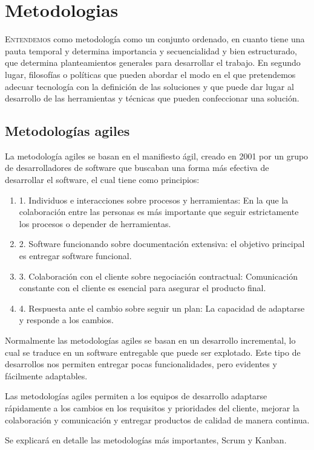 \chapter{Metodologias}
\label{chap:metodologias}


\lettrine{E}{ntendemos} como metodología como un conjunto ordenado, en cuanto tiene una pauta temporal y determina importancia y secuencialidad y bien estructurado, que determina planteamientos generales para desarrollar el trabajo. En segundo lugar, filosofías o políticas que pueden abordar el modo en el que pretendemos adecuar tecnología con la definición de las soluciones y que puede dar lugar al desarrollo de las herramientas y técnicas que pueden confeccionar una solución. 

\section{Metodologías agiles}

La metodología agiles se basan en el manifiesto ágil, creado en 2001 por un grupo de desarrolladores de software que buscaban una forma más efectiva de desarrollar el software, el cual tiene como principios:

\begin{enumerate}
    \item 1.	Individuos e interacciones sobre procesos y herramientas: En la que la colaboración entre las personas es más importante que seguir estrictamente los procesos o depender de herramientas.
    \item 2.	Software funcionando sobre documentación extensiva: el objetivo principal es entregar software funcional.
    \item 3.	Colaboración con el cliente sobre negociación contractual: Comunicación constante con el cliente es esencial para asegurar el producto final.
    \item 4.	Respuesta ante el cambio sobre seguir un plan: La capacidad de adaptarse y responde a los cambios.
\end{enumerate}

Normalmente las metodologías agiles se basan en un desarrollo incremental, lo cual se traduce en un software entregable que puede ser explotado. Este tipo de desarrollos nos permiten entregar pocas funcionalidades, pero evidentes y fácilmente adaptables.

Las metodologías agiles permiten a los equipos de desarrollo adaptarse rápidamente a los cambios en los requisitos y prioridades del cliente, mejorar la colaboración y comunicación y entregar productos de calidad de manera continua.

Se explicará en detalle las metodologías más importantes, Scrum y Kanban.
